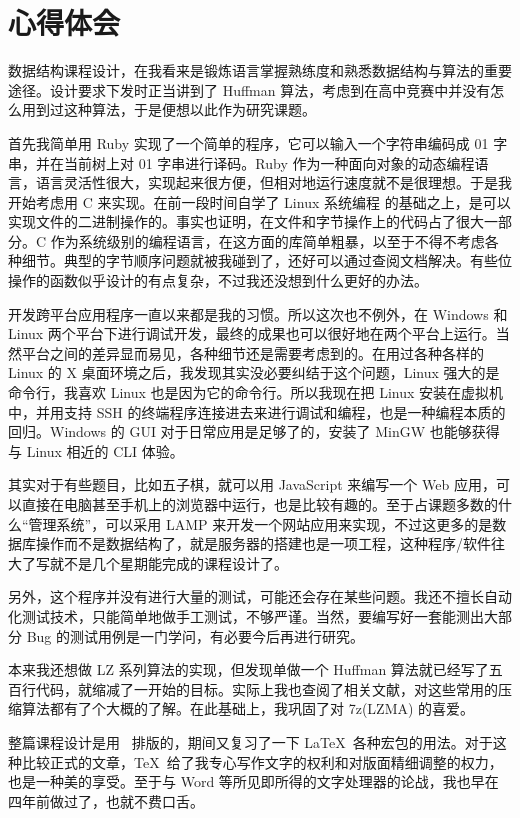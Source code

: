 \newpage
\section*{心得体会}

数据结构课程设计，在我看来是锻炼语言掌握熟练度和熟悉数据结构与算法的重要途径。设计要求下发时正当讲到了 Huffman 算法，考虑到在高中竞赛中并没有怎么用到过这种算法，于是便想以此作为研究课题。

首先我简单用 Ruby 实现了一个简单的程序，它可以输入一个字符串编码成 01 字串，并在当前树上对 01 字串进行译码。Ruby 作为一种面向对象的动态编程语言，语言灵活性很大，实现起来很方便，但相对地运行速度就不是很理想。于是我开始考虑用 C 来实现。在前一段时间自学了 Linux 系统编程 \cite{linuxmnl} 的基础之上，是可以实现文件的二进制操作的。事实也证明，在文件和字节操作上的代码占了很大一部分。C 作为系统级别的编程语言，在这方面的库简单粗暴，以至于不得不考虑各种细节。典型的字节顺序问题就被我碰到了，还好可以通过查阅文档解决。有些位操作的函数似乎设计的有点复杂，不过我还没想到什么更好的办法。

开发跨平台应用程序一直以来都是我的习惯。所以这次也不例外，在 Windows 和 Linux 两个平台下进行调试开发，最终的成果也可以很好地在两个平台上运行。当然平台之间的差异显而易见，各种细节还是需要考虑到的。在用过各种各样的 Linux 的 X 桌面环境之后，我发现其实没必要纠结于这个问题，Linux 强大的是命令行，我喜欢 Linux 也是因为它的命令行。所以我现在把 Linux 安装在虚拟机中，并用支持 SSH 的终端程序连接进去来进行调试和编程，也是一种编程本质的回归。Windows 的 GUI 对于日常应用是足够了的，安装了 MinGW 也能够获得与 Linux 相近的 CLI 体验。

其实对于有些题目，比如五子棋，就可以用 JavaScript 来编写一个 Web 应用，可以直接在电脑甚至手机上的浏览器中运行，也是比较有趣的。至于占课题多数的什么“管理系统”，可以采用 LAMP 来开发一个网站应用来实现，不过这更多的是数据库操作而不是数据结构了，就是服务器的搭建也是一项工程，这种程序/软件往大了写就不是几个星期能完成的课程设计了。

另外，这个程序并没有进行大量的测试，可能还会存在某些问题。我还不擅长自动化测试技术，只能简单地做手工测试，不够严谨。当然，要编写好一套能测出大部分 Bug 的测试用例是一门学问，有必要今后再进行研究。

本来我还想做 LZ 系列算法的实现，但发现单做一个 Huffman 算法就已经写了五百行代码，就缩减了一开始的目标。实际上我也查阅了相关文献，对这些常用的压缩算法都有了个大概的了解。在此基础上，我巩固了对 7z(LZMA) 的喜爱。

整篇课程设计是用 \LaTeXe\ 排版的，期间又复习了一下 \LaTeX\ 各种宏包的用法。对于这种比较正式的文章，\TeX\ 给了我专心写作文字的权利和对版面精细调整的权力，也是一种美的享受。至于与 Word 等所见即所得的文字处理器的论战，我也早在四年前做过了，也就不费口舌。

